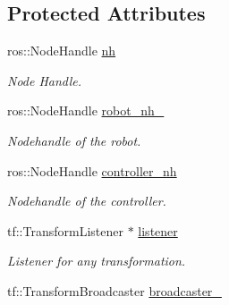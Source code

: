 \subsection*{Protected Attributes}
\begin{DoxyCompactItemize}
\item 
ros\+::\+Node\+Handle \hyperlink{classController_a24e3d3c2536f6ed29018bad1fd53dae2}{nh}\hypertarget{classController_a24e3d3c2536f6ed29018bad1fd53dae2}{}\label{classController_a24e3d3c2536f6ed29018bad1fd53dae2}

\begin{DoxyCompactList}\small\item\em Node Handle. \end{DoxyCompactList}\item 
ros\+::\+Node\+Handle \hyperlink{classController_aa6d96943491ef49575f81375f0b20dce}{robot\+\_\+nh\+\_\+}\hypertarget{classController_aa6d96943491ef49575f81375f0b20dce}{}\label{classController_aa6d96943491ef49575f81375f0b20dce}

\begin{DoxyCompactList}\small\item\em Nodehandle of the robot. \end{DoxyCompactList}\item 
ros\+::\+Node\+Handle \hyperlink{classController_ad08bfebfb2c09f1e827d36b0aee24532}{controller\+\_\+nh}\hypertarget{classController_ad08bfebfb2c09f1e827d36b0aee24532}{}\label{classController_ad08bfebfb2c09f1e827d36b0aee24532}

\begin{DoxyCompactList}\small\item\em Nodehandle of the controller. \end{DoxyCompactList}\item 
tf\+::\+Transform\+Listener $\ast$ \hyperlink{classController_afea373f808d583e4ad613f119439a8f5}{listener}\hypertarget{classController_afea373f808d583e4ad613f119439a8f5}{}\label{classController_afea373f808d583e4ad613f119439a8f5}

\begin{DoxyCompactList}\small\item\em Listener for any transformation. \end{DoxyCompactList}\item 
tf\+::\+Transform\+Broadcaster \hyperlink{classController_a934f19927283d24fbf79b5d62e23bed3}{broadcaster\+\_\+}\hypertarget{classController_a934f19927283d24fbf79b5d62e23bed3}{}\label{classController_a934f19927283d24fbf79b5d62e23bed3}


\end{DoxyCompactItemize}
